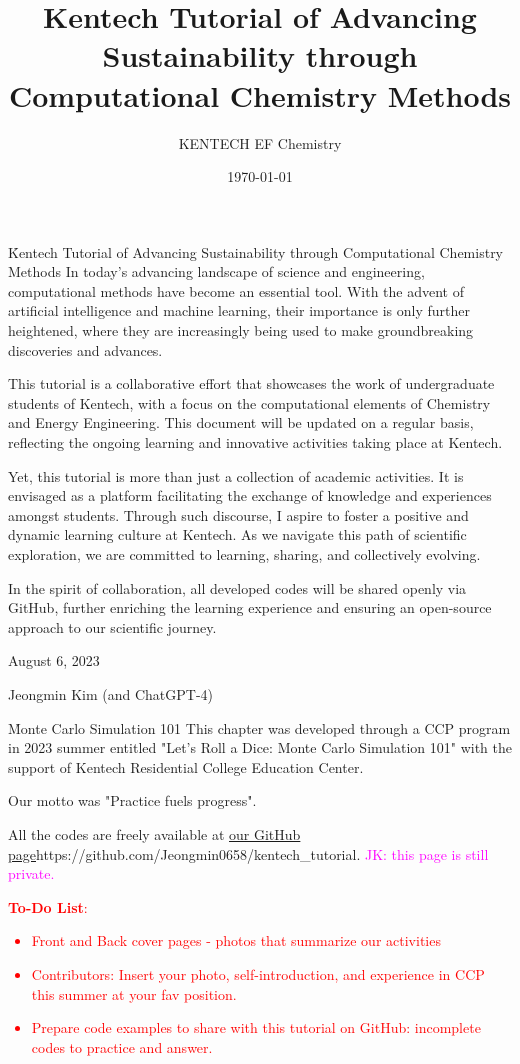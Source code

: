 \documentclass{textbook}
\title     {Kentech Tutorial of Advancing Sustainability through Computational Chemistry Methods}
\author     {KENTECH EF Chemistry}
\date       {\today}
\begin{document}
\h*{Kentech Tutorial of Advancing Sustainability through Computational Chemistry Methods} %
In today's advancing landscape of science and engineering,  computational methods have become an essential tool. With the advent of artificial intelligence and machine learning, their importance is only further heightened, where they are increasingly being used to make groundbreaking discoveries and advances.

This tutorial is a collaborative effort that showcases the work of undergraduate students of Kentech, with a focus on the computational elements of Chemistry and Energy Engineering. This document will be updated on a regular basis, reflecting the ongoing learning and innovative activities taking place at Kentech.

Yet, this tutorial is more than just a collection of academic activities. It is envisaged as a platform facilitating the exchange of knowledge and experiences amongst students. Through such discourse, I aspire to foster a positive and dynamic learning culture at Kentech. As we navigate this path of scientific exploration, we are committed to learning, sharing, and collectively evolving.

In the spirit of collaboration, all developed codes will be shared openly via GitHub, further enriching the learning experience and ensuring an open-source approach to our scientific journey.

August 6, 2023

Jeongmin Kim (and ChatGPT-4)

\toc
\h{Monte Carlo Simulation 101}
This chapter was developed through a CCP program in 2023 summer entitled "Let's Roll a Dice: Monte Carlo Simulation 101" with the support of Kentech Residential College Education Center.

Our motto was "Practice fuels progress".

All the codes are freely available at \url{our GitHub page}{https://github.com/Jeongmin0658/kentech_tutorial}. \textcolor{magenta}{JK: this page is still private.}

\textcolor{red}{\textbf{To-Do List}:
    \begin{itemize}
        \item Front and Back cover pages - photos that summarize our activities
        \item Contributors: Insert your photo, self-introduction, and experience in CCP this summer at your fav position.
        \item Prepare code examples to share with this tutorial on GitHub: incomplete codes to practice and answer.
    \end{itemize}
}
\end{document}
